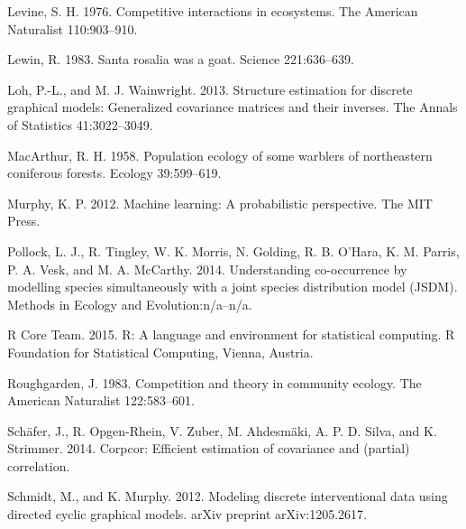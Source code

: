 \documentclass[12pt,]{article}
\begin{document}
\begin{spacing}{1.9}
\begin{flushleft}
Levine, S. H. 1976. Competitive interactions in ecosystems. The American
Naturalist 110:903--910.

Lewin, R. 1983. Santa rosalia was a goat. Science 221:636--639.

Loh, P.-L., and M. J. Wainwright. 2013. Structure estimation for
discrete graphical models: Generalized covariance matrices and their
inverses. The Annals of Statistics 41:3022--3049.

MacArthur, R. H. 1958. Population ecology of some warblers of
northeastern coniferous forests. Ecology 39:599--619.

Murphy, K. P. 2012. Machine learning: A probabilistic perspective. The
MIT Press.

Pollock, L. J., R. Tingley, W. K. Morris, N. Golding, R. B. O'Hara, K.
M. Parris, P. A. Vesk, and M. A. McCarthy. 2014. Understanding
co-occurrence by modelling species simultaneously with a joint species
distribution model (JSDM). Methods in Ecology and Evolution:n/a--n/a.

R Core Team. 2015. R: A language and environment for statistical
computing. R Foundation for Statistical Computing, Vienna, Austria.

Roughgarden, J. 1983. Competition and theory in community ecology. The
American Naturalist 122:583--601.

Schäfer, J., R. Opgen-Rhein, V. Zuber, M. Ahdesmäki, A. P. D. Silva, and
K. Strimmer. 2014. Corpcor: Efficient estimation of covariance and
(partial) correlation.

Schmidt, M., and K. Murphy. 2012. Modeling discrete interventional data
using directed cyclic graphical models. arXiv preprint arXiv:1205.2617.


\end{flushleft}
\end{spacing}
\end{document}
